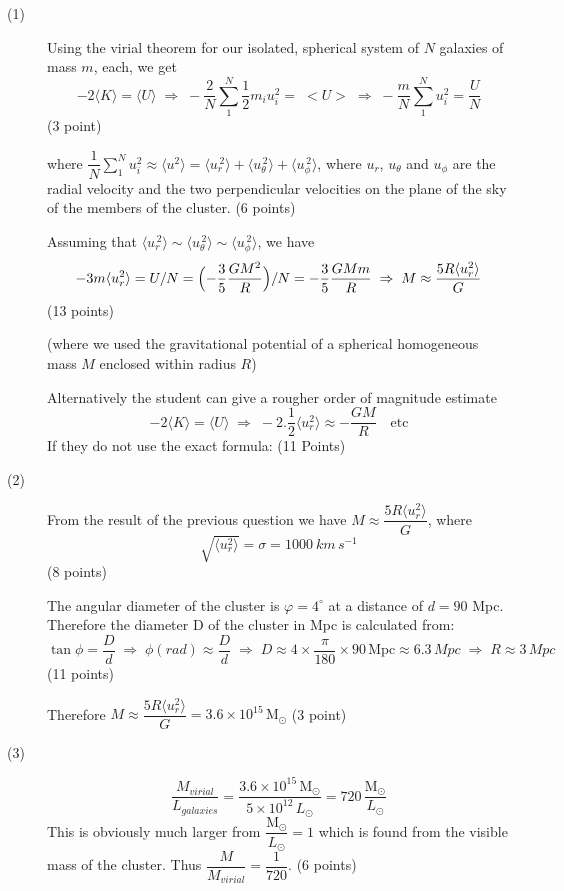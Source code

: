\begin{description}
\item[(1)] Using the virial theorem for our isolated, spherical system of $N$
galaxies of mass $m$, each, we get
\[
-2\langle K\rangle = \langle U\rangle
\;\Rightarrow\;
-\frac{2}{N}\sum_{1}^{N}\frac{1}{2}m_i u_i^2 = \;<U>
\;\Rightarrow\;
-\frac{m}{N}\sum_{1}^{N}u_i^2 = \frac{U}{N}
\]
\hfill(3 point)

where
$\dfrac{1}{N}\displaystyle\sum_{1}^{N}u_i^2 \approx \langle u^2\rangle
= \langle u_r^{\,2}\rangle + \langle u_\theta^{\,2}\rangle
+ \langle u_\phi^{\,2}\rangle$,
where $u_r$, $u_\theta$ and $u_\phi$ are the radial velocity and the two
perpendicular velocities on the plane of the sky of the members of the
cluster.
\hfill(6 points)

Assuming that
$\langle u_r^{\,2}\rangle \sim \langle u_\theta^{\,2}\rangle
\sim \langle u_\phi^{\,2}\rangle$, we have
\[
-3m\langle u_r^2\rangle = U/N
= \Bigl(-\frac{3}{5}\frac{GM^2}{R}\Bigr)/N
= -\frac{3}{5}\frac{GMm}{R}
\;\Rightarrow\;
M \approx \frac{5R\langle u_r^2\rangle}{G}
\]
\hfill(13 points)

(where we used the gravitational potential of a spherical homogeneous mass
$M$ enclosed within radius $R$)

Alternatively the student can give a rougher order of magnitude estimate
\[
-2\langle K\rangle = \langle U\rangle
\;\Rightarrow\;
-2.\frac{1}{2}\langle u_r^2\rangle \approx -\frac{GM}{R}
\quad\text{etc}
\]
If they do not use the exact formula:
\hfill(11 Points)

\item[(2)] From the result of the previous question we have
$M \approx \dfrac{5R\langle u_r^2\rangle}{G}$, where
\[
\sqrt{\langle u_r^2\rangle} = \sigma = 1000\ km\,s^{-1}
\]
\hfill(8 points)

The angular diameter of the cluster is $\varphi = 4^\circ$ at a distance of
$d = 90$ Mpc. Therefore the diameter D of the cluster in Mpc is calculated
from:
\[
\tan\phi = \frac{D}{d}
\;\Rightarrow\;
\phi(rad) \approx \frac{D}{d}
\;\Rightarrow\;
D \approx 4\times\frac{\pi}{180}\times90\,\mathrm{Mpc} \approx 6.3\,Mpc
\;\Rightarrow\;
R \approx 3\,Mpc
\]
\hfill(11 points)

Therefore
$M \approx \dfrac{5R\langle u_r^2\rangle}{G} = 3.6\times10^{15}\,\mathrm{M}_\odot$
\hfill(3 point)

\item[(3)]
\[
\frac{M_{virial}}{L_{galaxies}}
= \frac{3.6\times10^{15}\,\mathrm{M}_\odot}{5\times10^{12}\,L_\odot}
= 720\,\frac{\mathrm{M}_\odot}{L_\odot}
\]
This is obviously much larger from
$\dfrac{\mathrm{M}_\odot}{L_\odot} = 1$ which is found from the visible mass
of the cluster. Thus $\dfrac{M}{M_{virial}} = \dfrac{1}{720}$.
\hfill(6 points)
\end{description}

